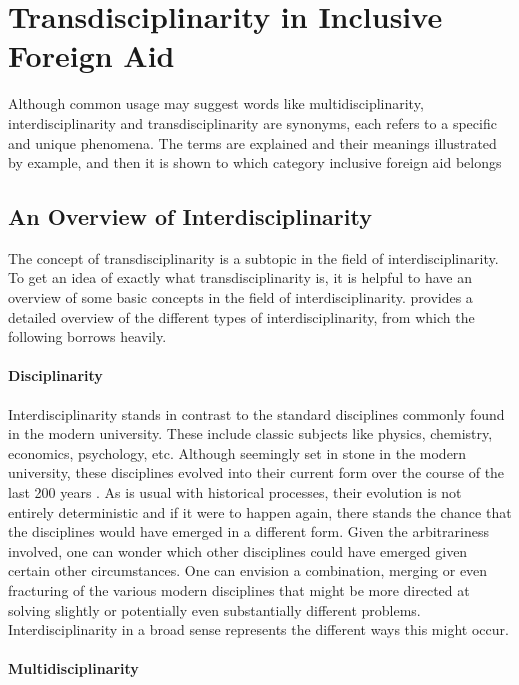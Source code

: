 \documentclass[a4paper]{article}
\begin{document}
\newpage

\section{Transdisciplinarity in Inclusive Foreign Aid}

Although common usage may suggest words like multidisciplinarity,
interdisciplinarity and transdisciplinarity are synonyms, each refers to a
specific and unique phenomena. The terms are explained and their meanings
illustrated by example, and then it is shown to which category inclusive
foreign aid belongs

\subsection{An Overview of Interdisciplinarity}

The concept of transdisciplinarity is a subtopic in the field of
interdisciplinarity. To get an idea of exactly what transdisciplinarity is, it
is helpful to have an overview of some basic concepts in the field of
interdisciplinarity. \cite{klein2010taxonomy} provides a detailed overview of
the different types of interdisciplinarity, from which the following borrows
heavily.

\paragraph{Disciplinarity}

Interdisciplinarity stands in contrast to the standard disciplines commonly
found in the modern university. These include classic subjects like physics,
chemistry, economics, psychology, etc. Although seemingly set in stone in the
modern university, these disciplines evolved into their current form over the
course of the last 200 years \citep{weingart2010short}. As is usual with
historical processes, their evolution is not entirely deterministic and if it
were to happen again, there stands the chance that the disciplines would have
emerged in a different form. Given the arbitrariness involved, one can wonder
which other disciplines could have emerged given certain other circumstances.
One can envision a combination, merging or even fracturing of the various
modern disciplines that might be more directed at solving slightly or
potentially even substantially different problems. Interdisciplinarity in a
broad sense represents the different ways this might occur.

\paragraph{Multidisciplinarity}
\end{document}
